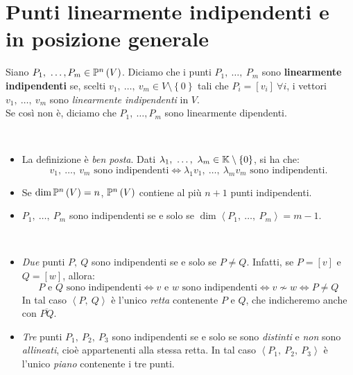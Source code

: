 \section{Punti linearmente indipendenti e in posizione generale}
\begin{define}
	Siano $P_1,\ \ldots, P_m\in\proj{V}$. Diciamo che i punti $P_1,\ \ldots,\ P_m$ sono \textbf{linearmente indipendenti} se, scelti $v_1,\ \ldots,\ v_m\in V\setminus\left\{0\right\}$ tali che $P_i=\left[v_i\right]\ \forall i$, i vettori $v_1,\ \ldots,\ v_m$ sono \textit{linearmente indipendenti} in $V$.\\
	Se così non è, diciamo che $P_1,\ \ldots, P_m$ sono linearmente dipendenti.
\end{define}
\begin{observe}~{}
	\begin{itemize}
		\item La definizione è \textit{ben posta}. Dati $\lambda_1,\ \ldots,\ \lambda_m\in\kamp\setminus\left\{0\right\}$, si ha che:
		\begin{equation*}
			v_1,\ \ldots,\ v_m\text{ sono indipendenti}\iff\lambda_1 v_1,\ \ldots,\ \lambda_m v_m\text{ sono indipendenti.}
		\end{equation*}
		\item Se $\dim \proj{V}=n$, $\proj{V}$ contiene al più $n+1$ punti indipendenti.
		\item $P_1,\ \ldots,\ P_m$ sono indipendenti se e solo se $\dim\left<P_1,\ \ldots,\ P_m\right>=m-1$.
	\end{itemize}
\end{observe}
\begin{examples}~{}
	\begin{itemize}
		\item \textit{Due} punti $P,\ Q$ sono indipendenti se e solo se $P\neq Q$. Infatti, se $P=\left[v\right]$ e $Q=\left[w\right]$, allora:
		\begin{equation*}
			P\text{ e }Q\text{ sono indipendenti}\iff v\text{ e }w\text{ sono indipendenti}\iff v\nsim w\iff P\neq Q
		\end{equation*}
		In tal caso $\left<P,\ Q\right>$ è l'unico \textit{retta} contenente $P$ e $Q$, che indicheremo anche con $\overline{PQ}$.
		\item \textit{Tre} punti $P_1,\ P_2,\ P_3$ sono indipendenti se e solo se sono \textit{distinti} e \textit{non} sono \textit{allineati}, cioè appartenenti alla stessa retta. In tal caso $\left<P_1,\ P_2,\ P_3\right>$ è l'unico \textit{piano} contenente i tre punti.
	\end{itemize}
\end{examples}
